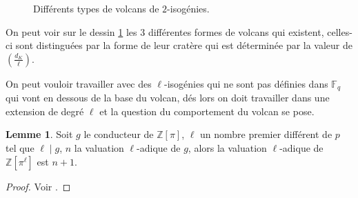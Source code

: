 \documentclass[10pt,a4paper]{book}
\theoremstyle{plain}
\theoremstyle{definition}
\newtheorem{lem}[thm]{Lemme}
\theoremstyle{definition}
\theoremstyle{definition}
\theoremstyle{definition}
\theoremstyle{remark}
\theoremstyle{remark}
\theoremstyle{definition}
\begin{document}
\begin{figure}[h]
\begin{center}
		\end{center}
		\caption{\label{fig:vol:3t} Différents types de volcans de $2$-isogénies.}
\end{figure}
On peut voir sur le dessin \ref{fig:vol:3t} les 3 différentes formes de volcans
qui existent, celles-ci sont distinguées par la forme de leur cratère qui est 
déterminée par la valeur de $\left( \frac{d_K}{\ell} \right)$.

On peut vouloir travailler avec des $\ell$-isogénies qui ne sont pas définies dans $\mathbb{F}_q$ qui vont en dessous de la base du volcan, dés lors on doit travailler dans une extension de degré $\ell$ et la question du comportement du volcan se pose.

\begin{lem}
\label{lem:val:ext}
Soit $g$ le conducteur de $\mathbb{Z}[\pi]$, $\ell$ un nombre premier différent de $p$ tel que $\ell \mid g$, $n$ la valuation $\ell$-adique de $g$, alors la valuation $\ell$-adique de $\mathbb{Z}[\pi^{\ell}]$ est $n+1$. 
\end{lem}

\begin{proof}
Voir \cite[Proposition 6]{MiretMSTV08}.
\end{proof}
\end{document}
